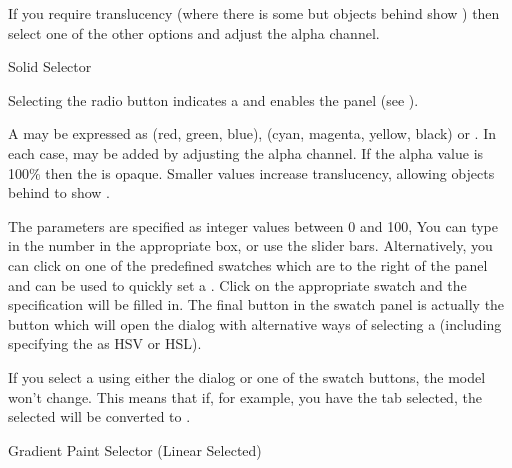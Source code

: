 If you require \gls{translucency} (where there is some 
but \glspl{object} behind show ) then select one of
the other  options and adjust the alpha channel.


{}
{Solid  Selector}

Selecting the  radio button indicates a
  and enables the
 panel (see ). 

A  may be expressed as
 (red, green, blue),
 (cyan, magenta, yellow, black) or
. In each case,
 may be added by adjusting
the alpha channel.  If the alpha value is 100\% then the
 is opaque.  Smaller values increase
\gls{translucency}, allowing \glspl{object} behind to show
.

The parameters are specified as integer values between 0 and 100,
You can type in the number in the appropriate box, or use
the slider bars. Alternatively, you can click on one of the predefined swatches
which are to the right of the  panel 
and can be used to quickly set a . Click on the 
appropriate swatch and the  specification will be
filled in. The final button in the swatch panel is actually the 
 button which will open the
 dialog with
alternative ways of selecting a  (including
specifying the  as HSV or HSL).

\begin{information}
If you select a  using
either the  dialog or one of the swatch
buttons, the  model won't change. This means that if,
for example, you have the  tab selected,
the selected  will be converted to
.
\end{information}


{}
{Gradient Paint Selector (Linear Selected)}

